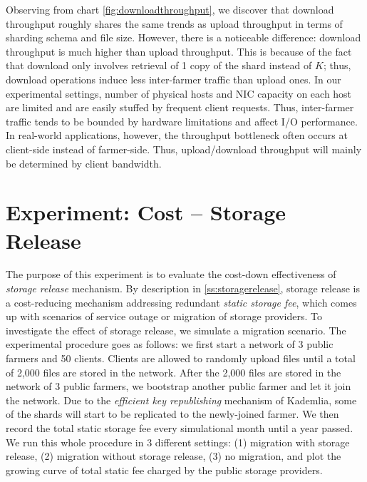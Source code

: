 Observing from chart \ref{fig:downloadthroughput}, we discover that download throughput roughly shares the same trends as upload throughput in terms of sharding schema and file size. However, there is a noticeable difference: download throughput is much higher than upload throughput. This is because of the fact that download only involves retrieval of 1 copy of the shard instead of $K$; thus, download operations induce less inter-farmer traffic than upload ones. In our experimental settings, number of physical hosts and NIC capacity on each host are limited and are easily stuffed by frequent client requests. Thus, inter-farmer traffic tends to be bounded by hardware limitations and affect I/O performance. In real-world applications, however, the throughput bottleneck often occurs at client-side instead of farmer-side. Thus, upload/download throughput will mainly be determined by client bandwidth.

\section{Experiment: Cost -- Storage Release}
\label{s:expcoststoragerelease}

The purpose of this experiment is to evaluate the cost-down effectiveness of \textit{storage release} mechanism. By description in \ref{ss:storagerelease}, storage release is a cost-reducing mechanism addressing redundant \textit{static storage fee}, which comes up with scenarios of service outage or migration of storage providers. To investigate the effect of storage release, we simulate a migration scenario. The experimental procedure goes as follows: we first start a network of 3 public farmers and 50 clients. Clients are allowed to randomly upload files until a total of 2,000 files are stored in the network. After the 2,000 files are stored in the network of 3 public farmers, we bootstrap another public farmer and let it join the network. Due to the \textit{efficient key republishing} mechanism of Kademlia, some of the shards will start to be replicated to the newly-joined farmer. We then record the total static storage fee every simulational month until a year passed. We run this whole procedure in 3 different settings: (1) migration with storage release, (2) migration without storage release, (3) no migration, and plot the growing curve of total static fee charged by the public storage providers.

